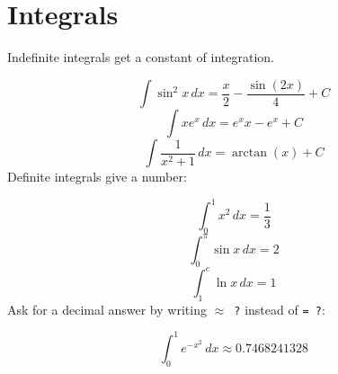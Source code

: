 \documentclass[11pt,a4paper]{article}
\theoremstyle{plain}
\theoremstyle{definition}
\theoremstyle{remark}
\begin{document}
\section*{Integrals}

Indefinite integrals get a constant of integration.

\begin{equation*}
  \int \sin^2 x \, dx = \frac{x}{2} - \frac{\sin\left(2 x\right)}{4} + C
\end{equation*}
\begin{equation*}
  \int x e^x \, dx = e^{x} x - e^{x} + C
\end{equation*}
\begin{equation*}
  \int \frac{1}{x^2 + 1} \, dx = \arctan\left(x\right) + C
\end{equation*}
Definite integrals give a number:

\begin{equation*}
  \int_0^1 x^2 \, dx = \frac{1}{3}
\end{equation*}
\begin{equation*}
  \int_0^{\pi} \sin x \, dx = 2
\end{equation*}
\begin{equation*}
  \int_1^e \ln x \, dx = 1
\end{equation*}
Ask for a decimal answer by writing \texttt{$\approx$ ?} instead of \texttt{= ?}:

\begin{equation*}
  \int_0^1 e^{-x^2} \, dx \approx 0.7468241328
\end{equation*}
\end{document}
